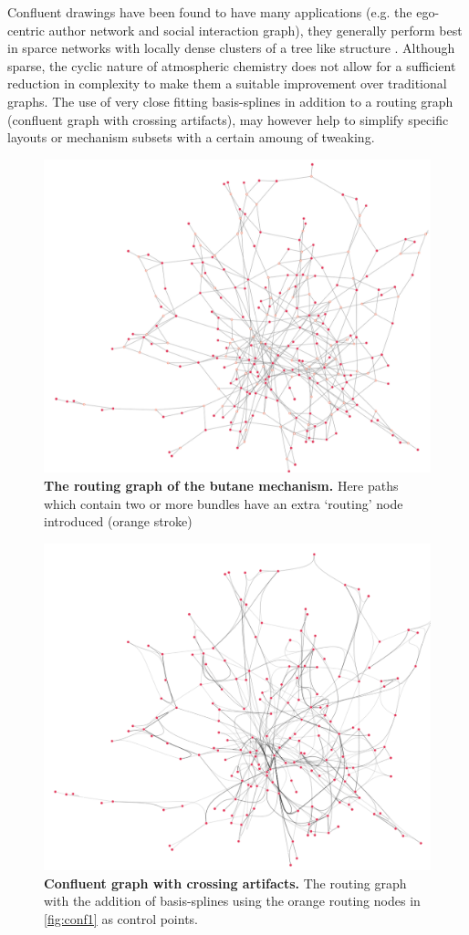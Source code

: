 Confluent drawings have been found to have many applications (e.g. the ego-centric author network and social interaction graph), they generally perform best in sparce networks with locally dense clusters of a tree like structure \cite{confluent17}. Although sparse, the cyclic nature of atmospheric chemistry does not allow for a sufficient reduction in complexity to make them a suitable improvement over traditional graphs. The use of very close fitting basis-splines in addition to a routing graph (confluent graph with crossing artifacts), may however help to simplify specific layouts or mechanism subsets with a certain amoung of tweaking. 

\begin{figure}[H]
     \centering
     \includegraphics[width=.7\textwidth]{figures_c1/layout/confluent/1.png}
        \caption{\textbf{The routing graph of the butane mechanism.} Here paths which contain two or more bundles have an extra `routing' node introduced (orange stroke) }
      \label{fig:conf1}
\end{figure}

\begin{figure}[H]
     \centering
     \includegraphics[width=.7\textwidth]{figures_c1/layout/confluent/2.png}
        \caption{\textbf{Confluent graph with crossing artifacts.} The routing graph with the addition of basis-splines using the orange routing nodes in \autoref{fig:conf1} as control points.}
      \label{fig:conf2}
\end{figure}

